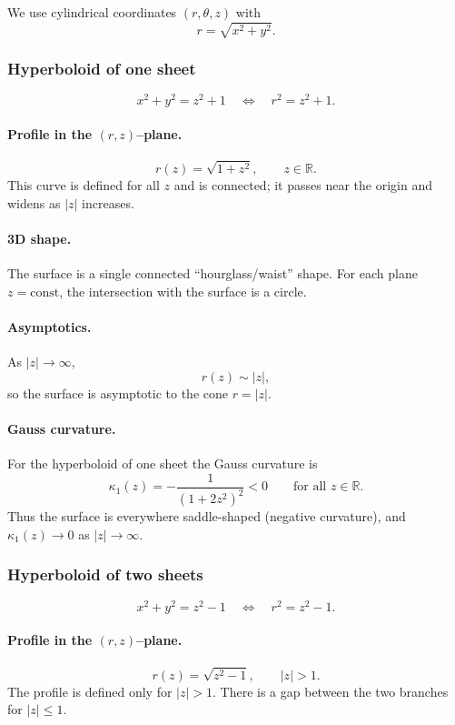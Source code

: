 \documentclass[12pt,a4paper]{article}
\theoremstyle{plain}
\theoremstyle{definition}      %
\begin{document}
We use cylindrical coordinates $(r,\theta,z)$ with
\[
r = \sqrt{x^2+y^2}.
\]

\subsubsection*{Hyperboloid of one sheet}

\[
x^2 + y^2 = z^2 + 1
\quad\Longleftrightarrow\quad
r^2 = z^2 + 1.
\]

\paragraph{Profile in the $(r,z)$–plane.}
\[
r(z) = \sqrt{1+z^2}, \qquad z\in\mathbb{R}.
\]
This curve is defined for all $z$ and is connected; it passes near the
origin and widens as $|z|$ increases.

\paragraph{3D shape.}
The surface is a single connected ``hourglass/waist'' shape. For each
plane $z=\text{const}$, the intersection with the surface is a circle.

\paragraph{Asymptotics.}
As $|z|\to\infty$,
\[
r(z) \sim |z|,
\]
so the surface is asymptotic to the cone $r=|z|$.

\paragraph{Gauss curvature.}
For the hyperboloid of one sheet the Gauss curvature is
\[
\kappa_1(z) = -\frac{1}{(1+2z^2)^2} < 0 \qquad \text{for all }z\in\mathbb{R}.
\]
Thus the surface is everywhere saddle-shaped (negative curvature), and
$\kappa_1(z)\to 0$ as $|z|\to\infty$.

\subsubsection*{Hyperboloid of two sheets}

\[
x^2 + y^2 = z^2 - 1
\quad\Longleftrightarrow\quad
r^2 = z^2 - 1.
\]

\paragraph{Profile in the $(r,z)$–plane.}
\[
r(z) = \sqrt{z^2-1}, \qquad |z|>1.
\]
The profile is defined only for $|z|>1$. There is a gap between the two
branches for $|z|\le 1$.
\end{document}
